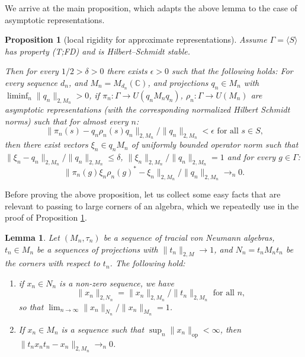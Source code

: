 \documentclass[11pt]{amsart}
\DeclareMathOperator{\op}{op}
\newcommand{\C}{{\mathbb{C}}}
\newtheorem{lemma}[theorem]{Lemma}
\newtheorem{proposition}[theorem]{Proposition}
\theoremstyle{definition}
\theoremstyle{remark}
\theoremstyle{definition}
\begin{document}
We arrive at the main proposition, which adapts the above lemma to the case of asymptotic representations.

\begin{proposition}[local rigidity for approximate representations]
\label{prop:rigidity_almost_rep}
Assume $\Gamma = \langle S \rangle$ has property (T;FD) and is Hilbert--Schmidt stable.

Then for every $1/2 > \delta>0$ there exists $\epsilon> 0$ such that the following holds:
For every sequence $d_n$, and $M_n = M_{d_n}(\C)$, and projections $q_n \in M_n$ with $\liminf_n \| q_n\|_{2,M_n} > 0$, if  $\pi_n:\Gamma\rightarrow U(q_n M_n q_n)$, $\rho_n: \Gamma \to U( M_n )$ are asymptotic representations (with the corresponding normalized Hilbert Schmidt norms) such that for almost every $n$:
$$\| \pi_n(s) - q_n\rho_n(s) q_n\|_{2,M_n} / \|q_n \|_{2,M_n}< \epsilon \text{ for all $s \in S$,}$$
then there exist vectors $\xi_n \in q_nM_n$ of uniformly bounded operator norm such that $ \| \xi_n -q_n \|_{2,M_n}  / \| q_n \|_{2,M_n}\leq \delta$, $\| \xi_n \|_{2,M_n} / \| q_n \|_{2,M_n} =1$ and for  every $g \in \Gamma$:
$$\| \pi_n(g)  \xi_n\rho_n(g)^* - \xi_n\|_{2,M_n} / \|q_n \|_{2,M_n}  \to_n 0.$$




\end{proposition}
Before proving the above proposition, let us collect some easy facts that are relevant to passing to large corners of an algebra, which we repeatedly use in the proof of Proposition \ref{prop:rigidity_almost_rep}.
\begin{lemma}\label{lem:flex_technicalities}
Let $(M_n,\tau_n)$ be a sequence of tracial von Neumann algebras, $t_n \in M_n$ be a sequences of projections with $\| t_n \|_{2,M} \to 1$, and $N_n = t_n M_n t_n$ be the corners with respect to $t_n$.
The following hold:
\begin{enumerate}
    \item  if $x_n \in N_n$ is a non-zero sequence, we have 
    $$\| x_n \|_{2,N_n} = \| x_n \|_{2,M_n} / \| t_n \|_{2,M_n} \text{ for all $n$},$$
    so that $\lim_{n\to \infty}\| x_n \|_{N_n} / \|x_n \|_{M_n} = 1$.
    \item If $x_n \in M_n$ is a sequence such that $\sup_n \| x_n \|_{\op} < \infty$, then $\| t_n x_n t_n - x_n\|_{2,M_n} \to_n 0$.
\end{enumerate}
\end{lemma}
\end{document}
